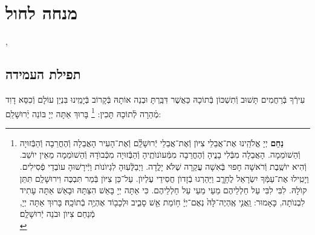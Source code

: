 \documentclass[twoside, openany, parskip=half, 11pt]{book}
\begin{document}
\vfill
\sepline

\chapter[מנחה לחול]{ מנחה לחול }
\tamid

\ketoret
\sepline
\ashrei

\halfkaddish

,

\section*{ תפילת העמידה }


\amidaopening{\ayt}{}

\weekdaysakedusha \vspace{0.5\baselineskip}

\sepline

\weekdaysabinah

\weekdaysateshuva

\weekdaysaselichah

\weekdaysageulah

\weekdaysaanneinu

\weekdaysarefuah

\weekdaysaberacha

\weekdaysashofar

\weekdaysamishpat

\weekdaysaminim

\weekdaysatzadikim

עִירְֿךָ בְּֿרַחֲמִים תָּשׁוּב וְֿתִשְׁכּוֹן בְּֿתוֹכָהּ כַּאֲשֶׁר דִּבַּֽרְתָּ וּבְנֵה אוֹתָהּ בְּֿקָרוֹב בְּֿיָמֵֽינוּ בִּנְיַן עוֹלָם וְֿכִסֵּא דָוִד מְֿהֵרָה לְֿתוֹכָהּ תָּכִין:
\footnote{
\textbf{נַחֵם}
יְיָ אֱלֹהֵֽינוּ אֶת־אֲבֵלֵי צִיּוֺן וְֿאֶת־אֲבֵלֵי יְֿרוּשָׁלַֽ֔֗͏ִם וְֿאֶת־הָעִיר הָאֲבֵלָה וְֿהֶחֳרֵבָה וְֿהַבְּֿזוּיָה וְֿהַשׁוֺמֵמָה. הָאֲבֵלָה מִבְּֿלִי בָנֱיהָ וְֿהֶחֳרֵבָה מִמְּֿעוֺנוֺתֶֽיהָ וְֿהַבְּֿזוּיָה מִכְּֿבוֺדָהּ וְֿהַשׁוֺמֵמָה מֵאֵין יוֺשֵׁב. וְֿהִיא יוֺשֶֽׁבֶת וְֿרֹאשָׁה חָפוּי בְּֿאִשָׁה עֲקַרָה שֶׁלֹּא יָלֳדָה. וַיְבַלְְּֿעֽוּהָ לִגְיוֺנוֺת וַיְּֿירָשׁוּהָ עוֺבְדֵי פְֿסִילִים. וַיָטִֽילוּ אֶת־עַמְּֿךָ יִשְׂרָאֵל לֶחָרֱֽב וַיַּהַרְגוּ בְֿזָדוֺן חֲסִידֵי עֶלְיוֺן. עַל־כֵּן צִיּוֺן בְּֿמַר תִּבְכֶּה וִירוּשָׁלַֽ͏ִם תִּתֵּן קוֺלָהּ. לִבִּי לִבִּי עַל חַלְלֵיהֶם מֵעַי מֵעַי עַל חַלְלֵיהֶם. כִּי אַתָּה יְיָ בָּאֵשׁ הִצַּתָּהּ וּבָאֵשׁ אַתָּה עָתִיד לִבְנוֺתָה, כָּאָמוּר: וַֽאֲנִ֤י אֶֽהְיֶה־לָּהּ֙ נְאֻם־יְיָ֔ ח֥וֹמַת אֵ֖שׁ סָבִ֑יב וּלְכָב֖וֹד אֶהְיֶ֥ה בְֿתוֹכָֽהּ׃
בָּרוּךְ אַתָּה יְיָ, מְֿנַחֵם צִיוֺן וּבֹנֵה יְֿרוּשָׁלַֽ͏ִם׃ \\
}
בָּרוּךְ אַתָּה יְיָ בּוֹנֵה יְֿרוּשָׁלַ‍ִם:
\end{document}

